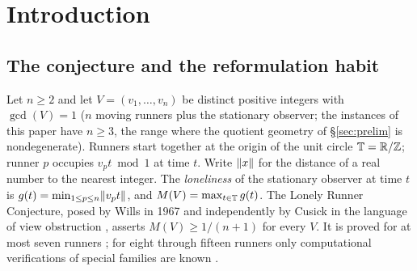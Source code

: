 \begin{abstract}
theorem---the sum-only equality $M(V)=\max_{\{u,w\}}\tau(u,w)$, the
rigid-zone translate-class classifications at the primes
$7,11,13,17,19,37$, and the composite-side structure at $p^2$ and $pq$,
stated with their hypothesis ledger---and a finite witness archive with a
certification ladder: exact deepest-hole classification at $n=3$,
independent away-certified and branch-and-bound certificates at $n=4$
(newly including $v=(1,2,3,16)$, $\rho=9/34$), exact refutations at
$n=5,6$, and, from the certification sessions, deepest-hole equality at
$n=5$ for every surviving multiple: $m=20,25,30$ in the first session
($\rho=\delta$ exactly at each) and the final row $m=10$ in the second,
audit-driven session ($\rho=7/22$ exactly), which paired a
random-local-search screen scaled roughly $50\times$ beyond the audit's
demonstrated search budget in starts (and far more in raw evaluations)
with a new exact Lipschitz box certificate. Every number cited in this abstract is re-asserted by a persisted,
independent, exact computation (a 225-item ledger with zero failures), and
the certification method carries a negative control that correctly
refuses a false statement.
The paper is a negative-results paper and claims no progress on the
conjecture itself: it proves no new cases of $\lrc$, and the surviving
equivalent forms are as hard as they ever were. What it contributes is the
obstruction's anatomy: why four natural toolkits, each correct and each
productive on its own terms, cannot cross the same gap.
\end{abstract}

\section{Introduction}\label{sec:intro}

\subsection{The conjecture and the reformulation habit}

Let $n\ge 2$ and let $V=(v_1,\dots,v_n)$ be distinct positive integers
with $\gcd(V)=1$ ($n$ moving runners plus the stationary observer; the
instances of this paper have $n\ge 3$, the range where the quotient
geometry of \S\ref{sec:prelim} is nondegenerate). Runners start together
at the origin of the unit circle
$\mathbb{T}=\mathbb{R}/\mathbb{Z}$; runner $p$ occupies $v_p t \bmod 1$ at time $t$. Write
$\lVert x \rVert$ for the distance of a real number to the nearest integer. The
\emph{loneliness} of the stationary observer at time $t$ is
$g(t)=\min_{1\le p\le n}\lVert v_p t \rVert$, and $M(V)=\max_{t\in\mathbb{T}}g(t)$. The
Lonely Runner Conjecture, posed by Wills in 1967 and independently by
Cusick in the language of view obstruction
\cite{PS-survey,Wills,Cusick1973}, asserts $M(V)\ge 1/(n{+}1)$ for every
$V$. It is proved for at most seven runners \cite{PS-survey}; for eight
through fifteen runners only computational verifications of special
families are known
\cite{Rosenfeld8,Trakulthongchai,Sungkawichai,Allikvere,MSS}.

